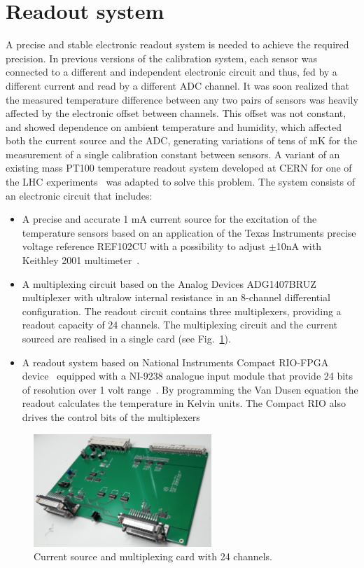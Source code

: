 \section{Readout system}
\label{sec:readout}
\noindent A precise and stable electronic readout system is needed to achieve the required precision. In previous versions of the calibration system, each sensor was connected to a different and independent electronic circuit and thus, fed by a different current and read by a different ADC channel. It was soon realized that the measured temperature difference between any two pairs of sensors was heavily affected by the electronic offset between channels. This offset was not constant, and showed dependence on ambient temperature and humidity, which affected both the current source and the ADC, generating variations of tens of mK for the measurement of a single calibration constant between sensors. A variant of an existing mass PT100 temperature readout system developed at CERN for one of the LHC experiments~\cite{bib:multiplexing_board} was adapted to solve this problem. The system consists of an electronic circuit that includes:

\begin{itemize}
\item A precise and accurate 1 mA current source for the excitation of the temperature sensors based on an application of the Texas Instruments precise voltage reference REF102CU with a possibility to adjust $\pm$10nA with Keithley 2001 multimeter~\cite{xavier,keithley}.%
\item A multiplexing circuit based on the Analog Devices ADG1407BRUZ multiplexer with ultralow internal resistance in an 8-channel differential configuration. The readout circuit contains three multiplexers, providing a readout capacity of 24 channels. The multiplexing circuit and the current sourced are realised in a single card (see Fig.~\ref{fig:readout}). 
\item A readout system based on National Instruments Compact RIO-FPGA device~\cite{compactrio} equipped with a NI-9238 analogue input module that provide 24 bits of resolution over 1 volt range~\cite{ni9238}. By programming the Van Dusen equation the readout calculates the temperature in Kelvin units. The Compact RIO also drives the control bits of the multiplexers
\end{itemize}

\begin{figure}[htbp]
\centering
\includegraphics[width=0.6\textwidth]{images/figure_2.png}
\caption{Current source and multiplexing card with 24 channels. 
\label{fig:readout}}
\end{figure}

